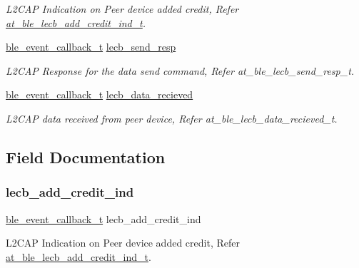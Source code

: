 \begin{DoxyCompactItemize}
\begin{DoxyCompactList}\small\item\em L2\+C\+AP Indication on Peer device added credit, Refer \mbox{\hyperlink{structat__ble__lecb__add__credit__ind__t}{at\+\_\+ble\+\_\+lecb\+\_\+add\+\_\+credit\+\_\+ind\+\_\+t}}. \end{DoxyCompactList}\item 
\mbox{\hyperlink{ble__manager_8h_a04ce4bb8cb8282f2762e3924b1773cc9}{ble\+\_\+event\+\_\+callback\+\_\+t}} \mbox{\hyperlink{structble__l2cap__event__cb_a4076300513afab41a4e27ee73b9180b7}{lecb\+\_\+send\+\_\+resp}}
\begin{DoxyCompactList}\small\item\em L2\+C\+AP Response for the data send command, Refer at\+\_\+ble\+\_\+lecb\+\_\+send\+\_\+resp\+\_\+t. \end{DoxyCompactList}\item 
\mbox{\hyperlink{ble__manager_8h_a04ce4bb8cb8282f2762e3924b1773cc9}{ble\+\_\+event\+\_\+callback\+\_\+t}} \mbox{\hyperlink{structble__l2cap__event__cb_afff1e6a8ba1e7b5622704c1c6f7a3f6c}{lecb\+\_\+data\+\_\+recieved}}
\begin{DoxyCompactList}\small\item\em L2\+C\+AP data received from peer device, Refer at\+\_\+ble\+\_\+lecb\+\_\+data\+\_\+recieved\+\_\+t. \end{DoxyCompactList}\end{DoxyCompactItemize}


\subsection{Field Documentation}
\mbox{\label{structble__l2cap__event__cb_a9c143adfcb634b9c39eff72d41b39ffb}} 
\subsubsection{\texorpdfstring{lecb\_add\_credit\_ind}{lecb\_add\_credit\_ind}}
{\footnotesize\ttfamily \mbox{\hyperlink{ble__manager_8h_a04ce4bb8cb8282f2762e3924b1773cc9}{ble\+\_\+event\+\_\+callback\+\_\+t}} lecb\+\_\+add\+\_\+credit\+\_\+ind}



L2\+C\+AP Indication on Peer device added credit, Refer \mbox{\hyperlink{structat__ble__lecb__add__credit__ind__t}{at\+\_\+ble\+\_\+lecb\+\_\+add\+\_\+credit\+\_\+ind\+\_\+t}}. 

